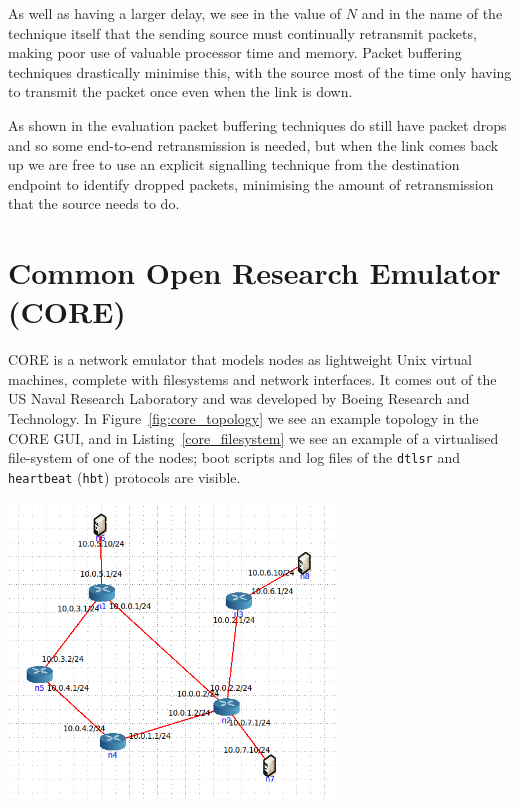 \documentclass[withindex,glossary,openany]{cam-thesis}
\begin{document}
As well as having a larger delay, we see in the value of $N$ and in the name of the technique itself that the sending source must continually retransmit packets, making poor use of valuable processor time and memory. Packet buffering techniques drastically minimise this, with the source most of the time only having to transmit the packet once even when the link is down.

As shown in the evaluation packet buffering techniques do still have packet drops and so some end-to-end retransmission is needed, but when the link comes back up we are free to use an explicit signalling technique from the destination endpoint to identify dropped packets, minimising the amount of retransmission that the source needs to do.

\section{Common Open Research Emulator (CORE)}

CORE is a network emulator that models nodes as lightweight Unix virtual machines, complete with filesystems and network interfaces. It comes out of the US Naval Research Laboratory and was developed by Boeing Research and Technology. In Figure~\ref{fig:core_topology} we see an example topology in the CORE GUI, and in Listing~\ref{core_filesystem} we see an example of a virtualised file-system of one of the nodes; boot scripts and log files of the \texttt{dtlsr} and \texttt{heartbeat} (\texttt{hbt}) protocols are visible.

\begin{center}
\begin{minipage}{0.9\textwidth} \centering
	\includegraphics[width=0.65\textwidth]{core_topology}
	\label{fig:core_topology}
\end{minipage}
\end{center}
\end{document}
